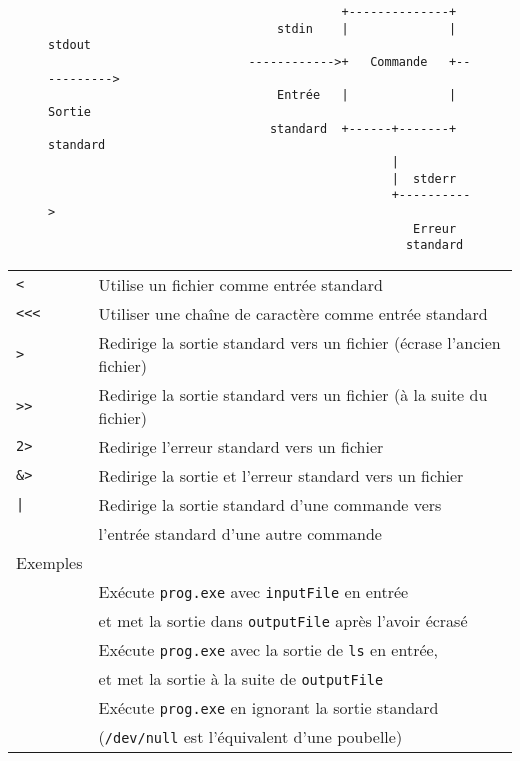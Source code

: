 \documentclass [a4paper]{article}
\begin{document}
\begin{figure}[h!]
\begin{verbatim}
                                         +--------------+
                                stdin    |              |   stdout
                            ------------>+   Commande   +----------->
                                Entrée   |              |   Sortie
                               standard  +------+-------+  standard
                                                |
                                                |  stderr
                                                +---------->
                                                   Erreur
                                                  standard
\end{verbatim}
\end{figure}
\noindent
\begin{tabular}{ ll }
\hline
{\verb+<+}  & Utilise un fichier comme entrée standard \\
{\verb+<<<+}& Utiliser une chaîne de caractère comme entrée standard \\
{\verb+>+}  & Redirige la sortie standard vers un fichier (écrase l'ancien fichier) \\
{\verb+>>+} & Redirige la sortie standard vers un fichier (à la suite du fichier) \\
{\verb+2>+} & Redirige l'erreur standard vers un fichier \\
{\verb+&>+} & Redirige la sortie et l'erreur standard vers un fichier \\
{\verb+|+}  & Redirige la sortie standard d'une commande vers \\
            & l'entrée standard d'une autre commande  \\
\hline
{Exemples}                                                   & \\
\hspace{0.5cm}{\verb+./prog.exe < inputFile > outputFile+}   & Exécute \verb+prog.exe+ avec \verb+inputFile+ en entrée \\
                                                             & et met la sortie dans \verb+outputFile+ après l'avoir écrasé \\
\hspace{0.5cm}{\verb+ls | ./prog.exe >> outputFile+}         & Exécute \verb+prog.exe+ avec la sortie de \verb+ls+ en entrée, \\
                                                             & et met la sortie à la suite de \verb+outputFile+ \\
    \hspace{0.5cm}{\verb+./prog.exe > /dev/null+}            & Exécute \verb+prog.exe+ en ignorant la sortie standard  \\
                                                             & (\verb+/dev/null+ est l'équivalent d'une poubelle) \\
\hline
\end{tabular}
\end{document}
